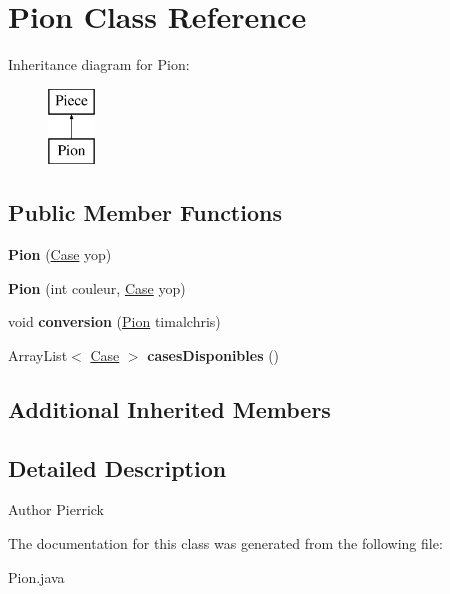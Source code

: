 \hypertarget{class_pion}{}\section{Pion Class Reference}
\label{class_pion}
Inheritance diagram for Pion\+:\begin{figure}[H]
\begin{center}
\leavevmode
\includegraphics[height=2.000000cm]{class_pion}
\end{center}
\end{figure}
\subsection*{Public Member Functions}
\begin{DoxyCompactItemize}
\item 
{\bfseries Pion} (\hyperlink{class_case}{Case} yop)\hypertarget{class_pion_a500086d10acd8c4d0cae02a81a1dee9c}{}\label{class_pion_a500086d10acd8c4d0cae02a81a1dee9c}

\item 
{\bfseries Pion} (int couleur, \hyperlink{class_case}{Case} yop)\hypertarget{class_pion_a3b34db5e4efb2685cdc20b56bbdc8f39}{}\label{class_pion_a3b34db5e4efb2685cdc20b56bbdc8f39}

\item 
void {\bfseries conversion} (\hyperlink{class_pion}{Pion} timalchris)\hypertarget{class_pion_a7fd483c15bbdcc0ccba1dc2d45700756}{}\label{class_pion_a7fd483c15bbdcc0ccba1dc2d45700756}

\item 
Array\+List$<$ \hyperlink{class_case}{Case} $>$ {\bfseries cases\+Disponibles} ()\hypertarget{class_pion_ac523e0b691274788dc3914ad62ea0f49}{}\label{class_pion_ac523e0b691274788dc3914ad62ea0f49}

\end{DoxyCompactItemize}
\subsection*{Additional Inherited Members}


\subsection{Detailed Description}
\begin{DoxyAuthor}{Author}
Pierrick 
\end{DoxyAuthor}


The documentation for this class was generated from the following file\+:\begin{DoxyCompactItemize}
\item 
Pion.\+java\end{DoxyCompactItemize}
